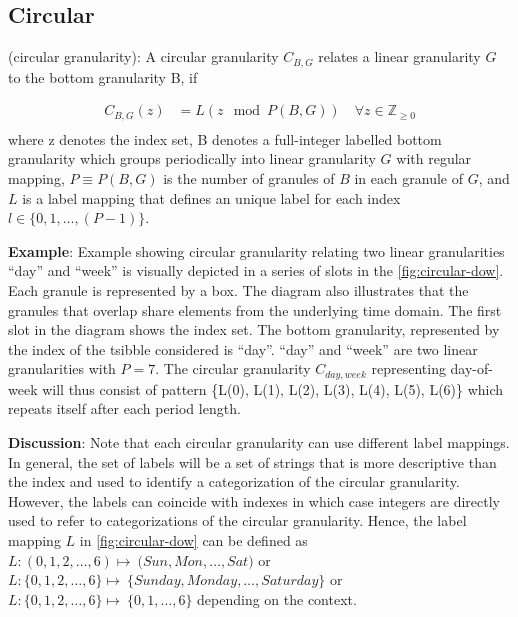 \documentclass[12pt]{article}
\begin{document}
\hypertarget{sec:circular-gran-def}{%
\subsection{Circular}\label{sec:circular-gran-def}}

\begin{definition}\label{def:circular}
(circular granularity): A circular granularity $C_{B, G}$ relates a linear granularity $G$ to the bottom granularity B, if

\begin{equation} \label{eq:circular-gran}
\begin{split}
C_{B, G}(z) & = {L}(z\mod P(B, G)) \quad \forall z \in \mathbb{Z}_{\geq 0} \\
\end{split}
\end{equation}
where
z denotes the index set,
B denotes a full-integer labelled bottom granularity which groups periodically into linear granularity $G$ with regular mapping, 
$P \equiv P(B, G)$ is the number of granules of $B$ in each granule of $G$,
and ${L}$ is a label mapping that defines an unique label for each index $l \in \{ 0,1,\dots, (P-1)\}$.

\end{definition}

\textbf{Example}: Example showing circular granularity relating two linear granularities ``day'' and ``week'' is visually depicted in a series of slots in the \autoref{fig:circular-dow}. Each granule is represented by a box. The diagram also illustrates that the granules that overlap share elements from the underlying time domain. The first slot in the diagram shows the index set. The bottom granularity, represented by the index of the tsibble considered is ``day''. ``day'' and ``week'' are two linear granularities with \(P = 7\). The circular granularity \(C_{day, week}\) representing day-of-week will thus consist of pattern \{L(0), L(1), L(2), L(3), L(4), L(5), L(6)\} which repeats itself after each period length.

\textbf{Discussion}: Note that each circular granularity can use different label mappings. In general, the set of labels will be a set of strings that is more descriptive than the index and used to identify a categorization of the circular granularity. However, the labels can coincide with indexes in which case integers are directly used to refer to categorizations of the circular granularity. Hence, the label mapping \(L\) in \autoref{fig:circular-dow} can be defined as \(L: ({0,1,2, \dots, 6}) \longmapsto\ ({Sun, Mon, \dots, Sat)}\) or \(L: \{0,1,2, \dots, 6\} \longmapsto\ \{Sunday, Monday, \dots, Saturday\}\) or \(L: \{0,1,2, \dots, 6\} \longmapsto\ \{0, 1, \dots, 6\}\) depending on the context.
\end{document}
